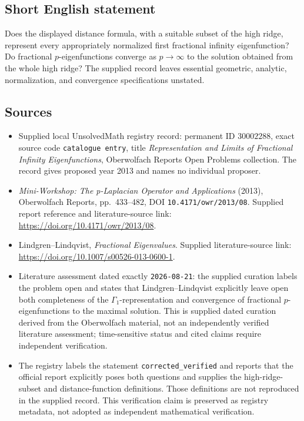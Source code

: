 \documentclass[11pt]{article}
\begin{document}
\subsection{Short English statement}
Does the displayed distance formula, with a suitable subset of the high ridge, represent every appropriately normalized first fractional infinity eigenfunction? Do fractional \(p\)-eigenfunctions converge as \(p\to\infty\) to the solution obtained from the whole high ridge? The supplied record leaves essential geometric, analytic, normalization, and convergence specifications unstated.
\subsection{Sources}
\begin{itemize}
\item Supplied local UnsolvedMath registry record: permanent ID \(30002288\), exact source code \texttt{catalogue entry}, title \emph{Representation and Limits of Fractional Infinity Eigenfunctions}, Oberwolfach Reports Open Problems collection. The record gives proposed year 2013 and names no individual proposer.
\item \emph{Mini-Workshop: The p-Laplacian Operator and Applications} (2013), Oberwolfach Reports, pp.\ 433--482, DOI \texttt{10.4171/owr/2013/08}. Supplied report reference and literature-source link: \url{https://doi.org/10.4171/owr/2013/08}.
\item Lindgren--Lindqvist, \emph{Fractional Eigenvalues}. Supplied literature-source link: \url{https://doi.org/10.1007/s00526-013-0600-1}.
\item Literature assessment dated exactly \texttt{2026-08-21}: the supplied curation labels the problem open and states that Lindgren--Lindqvist explicitly leave open both completeness of the \(\Gamma_1\)-representation and convergence of fractional \(p\)-eigenfunctions to the maximal solution. This is supplied dated curation derived from the Oberwolfach material, not an independently verified literature assessment; time-sensitive status and cited claims require independent verification.
\item The registry labels the statement \texttt{corrected\_verified} and reports that the official report explicitly poses both questions and supplies the high-ridge-subset and distance-function definitions. Those definitions are not reproduced in the supplied record. This verification claim is preserved as registry metadata, not adopted as independent mathematical verification.
\end{itemize}
\end{document}
